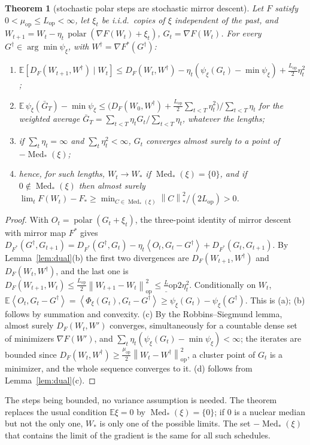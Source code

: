 \documentclass[11pt]{article}
\newtheorem{theorem}{Theorem}
\newcommand{\E}{\mathbb{E}}
\newcommand{\nop}[1]{\left\|#1\right\|_{\mathrm{op}}}
\newcommand{\nnuc}[1]{\left\|#1\right\|_{*}}
\newcommand{\inner}[2]{\left\langle #1, #2 \right\rangle}
\newcommand{\polar}{\operatorname{polar}}
\newcommand{\Med}{\operatorname{Med}_\ast}
\newcommand{\Lop}{L_{\mathrm{op}}}
\newcommand{\muop}{\mu_{\mathrm{op}}}
\begin{document}
\begin{theorem}[stochastic polar steps are stochastic mirror descent]\label{thm:smd}
Let $F$ satisfy $0<\muop\le\Lop<\infty$, let $\xi_t$ be i.i.d.\ copies of $\xi$ independent of the past, and
$W_{t+1}=W_t-\eta_t\,\polar(\nabla F(W_t)+\xi_t)$, $G_t=\nabla F(W_t)$. For every $G^\dagger\in\arg\min\psi_\xi$, with
$W^\dagger=\nabla F^\ast(G^\dagger)$:
\begin{enumerate}[label=(\alph*),itemsep=1pt,topsep=2pt]
\item $\E[D_F(W_{t+1},W^\dagger)\mid W_t]\le D_F(W_t,W^\dagger)-\eta_t(\psi_\xi(G_t)-\min\psi_\xi)+\frac{\Lop}2\eta_t^2$;
\item $\E\,\psi_\xi(\bar G_T)-\min\psi_\xi\le\big(D_F(W_0,W^\dagger)+\frac{\Lop}2\sum_{t<T}\eta_t^2\big)/\sum_{t<T}\eta_t$
for the weighted average $\bar G_T=\sum_{t<T}\eta_tG_t/\sum_{t<T}\eta_t$, whatever the lengths;
\item if $\sum_t\eta_t=\infty$ and $\sum_t\eta_t^2<\infty$, $G_t$ converges almost surely to a point of $-\Med(\xi)$;
\item hence, for such lengths, $W_t\to W_\ast$ if $\Med(\xi)=\{0\}$, and if $0\notin\Med(\xi)$ then almost surely
$\lim_tF(W_t)-F_\ast\ge\min_{C\in\Med(\xi)}\nnuc C^2/(2\Lop)>0$.
\end{enumerate}
\end{theorem}
\begin{proof}
With $O_t=\polar(G_t+\xi_t)$, the three-point identity of mirror descent with mirror map $F^\ast$ gives
$D_{F^\ast}(G^\dagger,G_{t+1})=D_{F^\ast}(G^\dagger,G_t)-\eta_t\inner{O_t}{G_t-G^\dagger}+D_{F^\ast}(G_t,G_{t+1})$. By
Lemma~\ref{lem:dual}(b) the first two divergences are $D_F(W_{t+1},W^\dagger)$ and $D_F(W_t,W^\dagger)$, and the last
one is $D_F(W_{t+1},W_t)\le\frac{\Lop}2\nop{W_{t+1}-W_t}^2\le\frac\Lop2\eta_t^2$. Conditionally on $W_t$,
$\E\inner{O_t}{G_t-G^\dagger}=\inner{\Phi_\xi(G_t)}{G_t-G^\dagger}\ge\psi_\xi(G_t)-\psi_\xi(G^\dagger)$. This is (a);
(b) follows by summation and convexity. (c) By the Robbins--Siegmund lemma, almost surely $D_F(W_t,W')$ converges,
simultaneously for a countable dense set of minimizers $\nabla F(W')$, and
$\sum_t\eta_t(\psi_\xi(G_t)-\min\psi_\xi)<\infty$; the iterates are bounded since
$D_F(W_t,W^\dagger)\ge\frac{\muop}2\nop{W_t-W^\dagger}^2$, a cluster point of $G_t$ is a minimizer, and the whole
sequence converges to it. (d) follows from Lemma~\ref{lem:dual}(c).
\end{proof}

The steps being bounded, no variance assumption is needed. The theorem replaces the usual condition $\E\xi=0$ by
$\Med(\xi)=\{0\}$; if $0$ is a nuclear median but not the only one, $W_\ast$ is only one of the possible limits. The
set $-\Med(\xi)$ that contains the limit of the gradient is the same for all such schedules.
\end{document}
